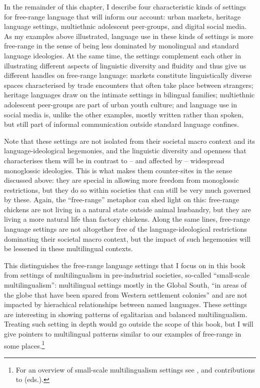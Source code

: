 In the remainder of this chapter, I describe four characteristic kinds of settings for free-range language that will inform our account: urban markets, heritage language settings, multiethnic adolescent peer-groups, and digital social media. As my examples above illustrated, language use in these kinds of settings is more free-range in the sense of being less dominated by monolingual and standard language ideologies. At the same time, the settings complement each other in illustrating different aspects of linguistic diversity and fluidity and thus give us different handles on free-range language: markets constitute linguistically diverse spaces characterised by trade encounters that often take place between strangers; heritage languages draw on the intimate settings in bilingual families; multiethnic adolescent peer-groups are part of urban youth culture; and language use in social media is, unlike the other examples, mostly written rather than spoken, but still part of informal communication outside standard language confines.

Note that these settings are not isolated from their societal macro context and its language-ideological hegemonies, and the linguistic diversity and openness that characterises them will be in contrast to – and affected by – widespread monoglossic ideologies. This is what makes them counter-sites in the sense discussed above: they are special in allowing more freedom from monoglossic restrictions, but they do so within societies that can still be very much governed by these. Again, the “free-range” metaphor can shed light on this: free-range chickens are not living in a natural state outside animal husbandry, but they are living a more natural life than factory chickens. Along the same lines, free-range language settings are not altogether free of the language-ideological restrictions dominating their societal macro context, but the impact of such hegemonies will be lessened in these multilingual contexts.

This distinguishes the free-range language settings that I focus on in this book from settings of multilingualism in pre-industrial societies, so-called “small-scale multilingualism”: multilingual settings mostly in the Global South, “in areas of the globe that have been spared from Western settlement colonies” \citep[35]{Lüpke2016} and are not impacted by hierachical relationships between named languages. These settings are interesting in showing patterns of egalitarian and balanced multilingualism. Treating such setting in depth would go outside the scope of this book, but I will give pointers to multilingual patterns similar to our examples of free-range in some places.\footnote{For an overview of small-scale multilingualism settings see \citet{Lüpke2016}, \citet{PakendorfEtAl2021} and contributions to \citet{DobrushinaEtal2021} (eds.).}

